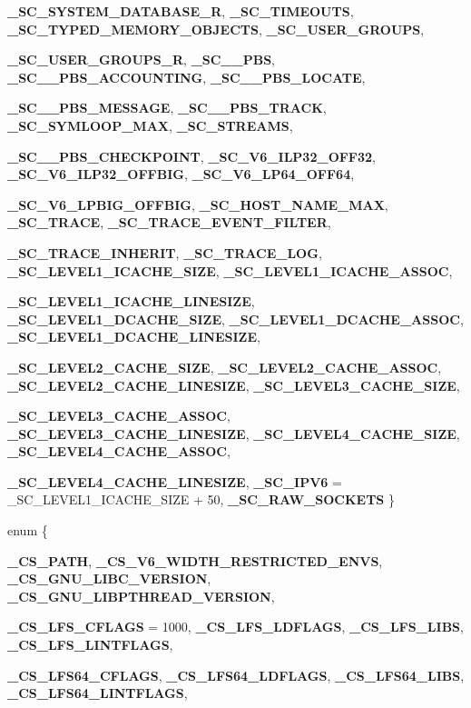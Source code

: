 \begin{DoxyCompactItemize}
\par
{\bf \_\-SC\_\-SYSTEM\_\-DATABASE\_\-R}, 
{\bf \_\-SC\_\-TIMEOUTS}, 
{\bf \_\-SC\_\-TYPED\_\-MEMORY\_\-OBJECTS}, 
{\bf \_\-SC\_\-USER\_\-GROUPS}, 
\par
{\bf \_\-SC\_\-USER\_\-GROUPS\_\-R}, 
{\bf \_\-SC\_\_\-PBS}, 
{\bf \_\-SC\_\_\-PBS\_\-ACCOUNTING}, 
{\bf \_\-SC\_\_\-PBS\_\-LOCATE}, 
\par
{\bf \_\-SC\_\_\-PBS\_\-MESSAGE}, 
{\bf \_\-SC\_\_\-PBS\_\-TRACK}, 
{\bf \_\-SC\_\-SYMLOOP\_\-MAX}, 
{\bf \_\-SC\_\-STREAMS}, 
\par
{\bf \_\-SC\_\_\-PBS\_\-CHECKPOINT}, 
{\bf \_\-SC\_\-V6\_\-ILP32\_\-OFF32}, 
{\bf \_\-SC\_\-V6\_\-ILP32\_\-OFFBIG}, 
{\bf \_\-SC\_\-V6\_\-LP64\_\-OFF64}, 
\par
{\bf \_\-SC\_\-V6\_\-LPBIG\_\-OFFBIG}, 
{\bf \_\-SC\_\-HOST\_\-NAME\_\-MAX}, 
{\bf \_\-SC\_\-TRACE}, 
{\bf \_\-SC\_\-TRACE\_\-EVENT\_\-FILTER}, 
\par
{\bf \_\-SC\_\-TRACE\_\-INHERIT}, 
{\bf \_\-SC\_\-TRACE\_\-LOG}, 
{\bf \_\-SC\_\-LEVEL1\_\-ICACHE\_\-SIZE}, 
{\bf \_\-SC\_\-LEVEL1\_\-ICACHE\_\-ASSOC}, 
\par
{\bf \_\-SC\_\-LEVEL1\_\-ICACHE\_\-LINESIZE}, 
{\bf \_\-SC\_\-LEVEL1\_\-DCACHE\_\-SIZE}, 
{\bf \_\-SC\_\-LEVEL1\_\-DCACHE\_\-ASSOC}, 
{\bf \_\-SC\_\-LEVEL1\_\-DCACHE\_\-LINESIZE}, 
\par
{\bf \_\-SC\_\-LEVEL2\_\-CACHE\_\-SIZE}, 
{\bf \_\-SC\_\-LEVEL2\_\-CACHE\_\-ASSOC}, 
{\bf \_\-SC\_\-LEVEL2\_\-CACHE\_\-LINESIZE}, 
{\bf \_\-SC\_\-LEVEL3\_\-CACHE\_\-SIZE}, 
\par
{\bf \_\-SC\_\-LEVEL3\_\-CACHE\_\-ASSOC}, 
{\bf \_\-SC\_\-LEVEL3\_\-CACHE\_\-LINESIZE}, 
{\bf \_\-SC\_\-LEVEL4\_\-CACHE\_\-SIZE}, 
{\bf \_\-SC\_\-LEVEL4\_\-CACHE\_\-ASSOC}, 
\par
{\bf \_\-SC\_\-LEVEL4\_\-CACHE\_\-LINESIZE}, 
{\bf \_\-SC\_\-IPV6} =  \_\-SC\_\-LEVEL1\_\-ICACHE\_\-SIZE + 50, 
{\bf \_\-SC\_\-RAW\_\-SOCKETS}
 \}
\item 
enum \{ \par
{\bf \_\-CS\_\-PATH}, 
{\bf \_\-CS\_\-V6\_\-WIDTH\_\-RESTRICTED\_\-ENVS}, 
{\bf \_\-CS\_\-GNU\_\-LIBC\_\-VERSION}, 
{\bf \_\-CS\_\-GNU\_\-LIBPTHREAD\_\-VERSION}, 
\par
{\bf \_\-CS\_\-LFS\_\-CFLAGS} =  1000, 
{\bf \_\-CS\_\-LFS\_\-LDFLAGS}, 
{\bf \_\-CS\_\-LFS\_\-LIBS}, 
{\bf \_\-CS\_\-LFS\_\-LINTFLAGS}, 
\par
{\bf \_\-CS\_\-LFS64\_\-CFLAGS}, 
{\bf \_\-CS\_\-LFS64\_\-LDFLAGS}, 
{\bf \_\-CS\_\-LFS64\_\-LIBS}, 
{\bf \_\-CS\_\-LFS64\_\-LINTFLAGS}, 

\end{DoxyCompactItemize}
